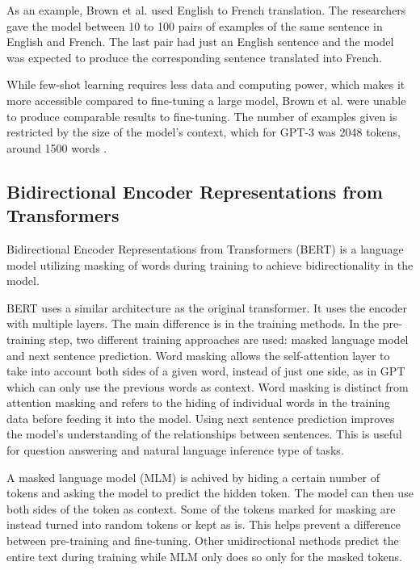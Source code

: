 \documentclass[twoside]{article}
\begin{document}
As an example, Brown et al. \cite{brown_language_2020} used English to French translation.
The researchers gave the model between 10 to 100 pairs of examples of the
same sentence in English and French. The last pair had just an English sentence
and the model was expected to produce the corresponding sentence translated into
French.

While few-shot learning requires less data and computing power, which makes it more
accessible compared to fine-tuning a large model, Brown et al. \cite{brown_language_2020} 
were unable to produce comparable results to fine-tuning.
The number of examples given is restricted by the size of the model's context,
which for GPT-3 was 2048 tokens, around 1500 words \cite{noauthor_pricing_nodate}.

\subsection{Bidirectional Encoder Representations from Transformers}
Bidirectional Encoder Representations from Transformers (BERT)
is a language model utilizing masking of words during training to achieve bidirectionality
in the model. \cite{devlin_bert_2019}

BERT uses a similar architecture as the original transformer. It uses the encoder with
multiple layers. The main difference is in the training methods. In the pre-training step,
two different training approaches are used: masked language model and next sentence prediction.
Word masking allows the self-attention layer to take into account both sides of a given word, instead
of just one side, as in GPT which can only use the previous words as context. Word masking is
distinct from attention masking and refers to the hiding of individual words in the training data
before feeding it into the model.
 Using next sentence
prediction improves the model's understanding of the relationships between sentences. This is
useful for question answering and natural language inference type of tasks. \cite{devlin_bert_2019}

A masked language model (MLM) is achived by hiding a certain number of tokens and
asking the model to predict the hidden token. The model can then use both sides of the token as
context. Some of the tokens marked for masking are instead turned 
into random tokens or kept as is. This helps prevent a difference between pre-training and fine-tuning.
Other unidirectional methods predict the entire text during training while MLM only 
does so only for the masked tokens. \cite{devlin_bert_2019}
\end{document}
